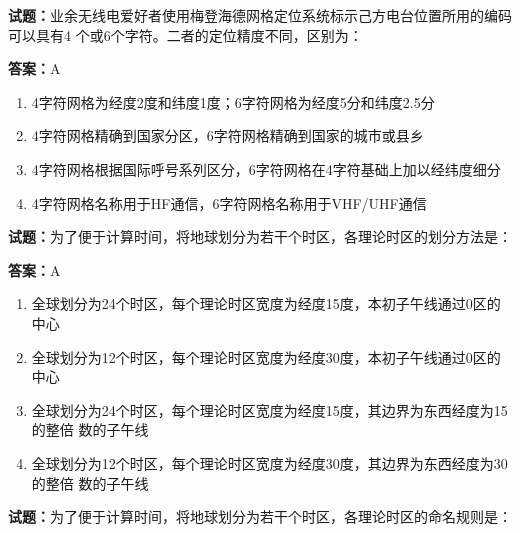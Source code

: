 \documentclass{ctexbook}
\begin{document}
\textbf{试题：}业余无线电爱好者使用梅登海德网格定位系统标示己方电台位置所用的编码可以具有4
个或6个字符。二者的定位精度不同，区别为： 

\textbf{答案：}A 

\begin{enumerate}[leftmargin=3em]
  \item 4字符网格为经度2度和纬度1度；6字符网格为经度5分和纬度2.5分 

  \item 4字符网格精确到国家分区，6字符网格精确到国家的城市或县乡 

  \item 4字符网格根据国际呼号系列区分，6字符网格在4字符基础上加以经纬度细分 

  \item 4字符网格名称用于HF通信，6字符网格名称用于VHF/UHF通信 

\end{enumerate}





\vspace{1em}

\textbf{试题：}为了便于计算时间，将地球划分为若干个时区，各理论时区的划分方法是： 

\textbf{答案：}A 

\begin{enumerate}[leftmargin=3em]
  \item 全球划分为24个时区，每个理论时区宽度为经度15度，本初子午线通过0区的中心 

  \item 全球划分为12个时区，每个理论时区宽度为经度30度，本初子午线通过0区的中心 


  \item 全球划分为24个时区，每个理论时区宽度为经度15度，其边界为东西经度为15的整倍
数的子午线 

  \item 全球划分为12个时区，每个理论时区宽度为经度30度，其边界为东西经度为30的整倍
数的子午线 

\end{enumerate}





\vspace{1em}

\textbf{试题：}为了便于计算时间，将地球划分为若干个时区，各理论时区的命名规则是： 
\end{document}
